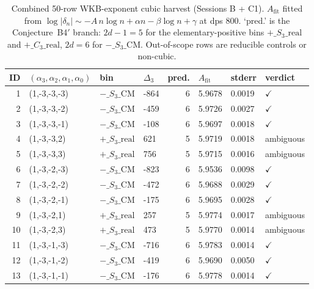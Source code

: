\begin{table}[ht]
\centering
\scriptsize
\caption{Combined 50-row WKB-exponent cubic harvest (Sessions B + C1). $A_{\mathrm{fit}}$ fitted from $\log|\delta_n| \sim -A\, n\log n + \alpha n - \beta\log n + \gamma$ at dps 800. `pred.' is the Conjecture~B4$'$ branch: $2d - 1 = 5$ for the elementary-positive bins $+\_S_3\_\mathrm{real}$ and $+\_C_3\_\mathrm{real}$, $2d = 6$ for $-\_S_3\_\mathrm{CM}$. Out-of-scope rows are reducible controls or non-cubic.}
\label{tab:pcf2-cubic-harvest-v2}
\begin{tabular}{rlllrlll}
\hline
\textbf{ID} & \textbf{$(\alpha_3,\alpha_2,\alpha_1,\alpha_0)$} & \textbf{bin} & \textbf{$\Delta_3$} & \textbf{pred.} & \textbf{$A_{\mathrm{fit}}$} & \textbf{stderr} & \textbf{verdict} \\ \hline
1 & (1,-3,-3,-3) & $-\_S_3\_\mathrm{CM}$ & -864 & 6 & 5.9678 & 0.0019 & $\checkmark$ \\
2 & (1,-3,-3,-2) & $-\_S_3\_\mathrm{CM}$ & -459 & 6 & 5.9726 & 0.0027 & $\checkmark$ \\
3 & (1,-3,-3,-1) & $-\_S_3\_\mathrm{CM}$ & -108 & 6 & 5.9697 & 0.0018 & $\checkmark$ \\
4 & (1,-3,-3,2) & $+\_S_3\_\mathrm{real}$ & 621 & 5 & 5.9719 & 0.0018 & ambiguous \\
5 & (1,-3,-3,3) & $+\_S_3\_\mathrm{real}$ & 756 & 5 & 5.9715 & 0.0016 & ambiguous \\
6 & (1,-3,-2,-3) & $-\_S_3\_\mathrm{CM}$ & -823 & 6 & 5.9536 & 0.0098 & $\checkmark$ \\
7 & (1,-3,-2,-2) & $-\_S_3\_\mathrm{CM}$ & -472 & 6 & 5.9688 & 0.0029 & $\checkmark$ \\
8 & (1,-3,-2,-1) & $-\_S_3\_\mathrm{CM}$ & -175 & 6 & 5.9695 & 0.0028 & $\checkmark$ \\
9 & (1,-3,-2,1) & $+\_S_3\_\mathrm{real}$ & 257 & 5 & 5.9774 & 0.0017 & ambiguous \\
10 & (1,-3,-2,3) & $+\_S_3\_\mathrm{real}$ & 473 & 5 & 5.9770 & 0.0014 & ambiguous \\
11 & (1,-3,-1,-3) & $-\_S_3\_\mathrm{CM}$ & -716 & 6 & 5.9783 & 0.0014 & $\checkmark$ \\
12 & (1,-3,-1,-2) & $-\_S_3\_\mathrm{CM}$ & -419 & 6 & 5.9690 & 0.0050 & $\checkmark$ \\
13 & (1,-3,-1,-1) & $-\_S_3\_\mathrm{CM}$ & -176 & 6 & 5.9778 & 0.0014 & $\checkmark$ \\

\end{tabular}
\end{table}
